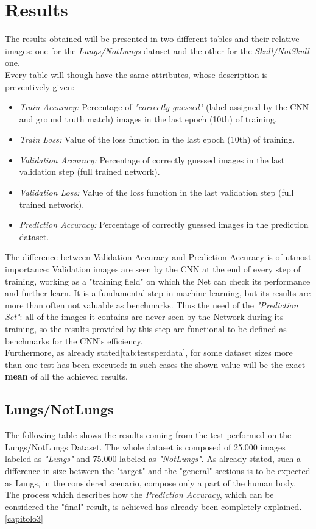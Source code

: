 \documentclass[../main.tex]{subfiles}
\begin{document}
\section{Results}
The results obtained will be presented in two different tables and their relative images: one for the \textit{Lungs/NotLungs} dataset and the other for the \textit{Skull/NotSkull} one.  \\
Every table will though have the same attributes, whose description is preventively given:

\begin{itemize}
	\item \textit{Train Accuracy:} Percentage of \textit{"correctly guessed"} (label assigned by the CNN and ground truth match) images in the last epoch (10th) of training.
	\item \textit{Train Loss:} Value of the loss function in the last epoch (10th) of training.
	\item \textit{Validation Accuracy:} Percentage of correctly guessed images in the last validation step (full trained network).
	\item \textit{Validation Loss:} Value of the loss function in the last validation step (full trained network).
	\item \textit{Prediction Accuracy:} Percentage of correctly guessed images in the prediction dataset.
\end{itemize}

The difference between Validation Accuracy and Prediction Accuracy is of utmost importance: Validation images are seen by the CNN at the end of every step of training, working as a "training field" on which the Net can check its performance and further learn. It is a fundamental step in machine learning, but its results are more than often not valuable as benchmarks. Thus the need of the \textit{"Prediction Set"}: all of the images it contains are never seen by the Network during its training, so the results provided by this step are functional to be defined as benchmarks for the CNN's efficiency.  \\
Furthermore, as already stated\ref{tab:testsperdata}, for some dataset sizes more than one test has been executed: in such cases the shown value will be the exact \textbf{mean} of all the achieved results.

\subsection{Lungs/NotLungs}
The following table shows the results coming from the test performed on the Lungs/NotLungs Dataset. The whole dataset is composed of 25.000 images labeled as \textit{"Lungs"} and 75.000 labeled as \textit{"NotLungs"}. As already stated, such a difference in size between the "target" and the "general" sections is to be expected as Lungs, in the considered scenario, compose only a part of the human body. The process which describes how the \textit{Prediction Accuracy}, which can be considered the "final" result, is achieved has already been completely explained.\ref{capitolo3}
\end{document}
